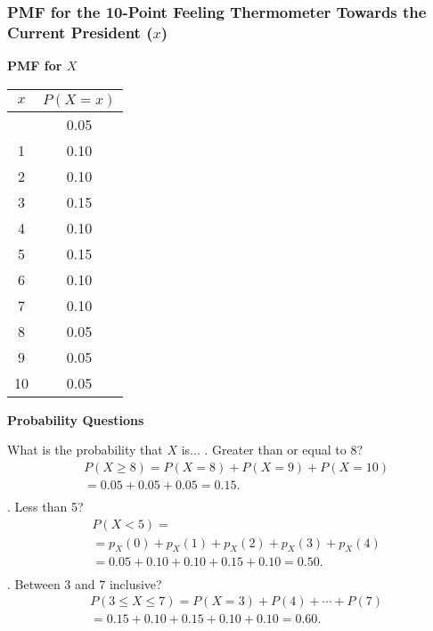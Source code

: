 \documentclass[handout]{beamer} %
\begin{document}
\begin{frame}
\frametitle{PMF for the 10-Point Feeling Thermometer Towards the Current President ($x$)}
    \begin{minipage}[t]{0.3\linewidth}
        \textbf{PMF for \( X \)} \\
        \begin{tabular}{c|c}
            \toprule
            \( x \) & \( P(X=x) \) \\
            \midrule \pause 
            0 & 0.05 \\
            1 & 0.10 \\
            2 & 0.10 \\
            3 & 0.15 \\
            4 & 0.10 \\
            5 & 0.15 \\
            6 & 0.10 \\
            7 & 0.10 \\
            8 & 0.05 \\
            9 & 0.05 \\
            10 & 0.05 \\
            \bottomrule 
        \end{tabular} \pause 
    \end{minipage}%
    \begin{minipage}[t]{0.55\linewidth}

        \textbf{Probability Questions}

\small
What is the probability that  $X$ is... . Greater than or equal to 8? \newline \vspace{-1.5em} \pause 
\begin{align*}
   & P(X \geq 8) = P(X=8) + P(X=9) + P(X=10) \\[0.1em]  
   & = 0.05 + 0.05 + 0.05 = 0.15. \\[-2em] 
\end{align*} . Less than 5?  \newline \vspace{-1.5em} \pause 
\begin{align*}  
   & P(X < 5) = \\[0.1em]
   & = p_X(0) + p_X(1) + p_X(2) + p_X(3) + p_X(4) \\[0.1em]
   & = 0.05 + 0.10 + 0.10 + 0.15 + 0.10 = 0.50. \\[-2em]  
\end{align*} . Between 3 and 7 inclusive?  \newline \vspace{-1.5em} \pause 
\begin{align*}  
   & P(3 \leq X \leq 7) = P(X=3) + P(4) + \cdots + P(7) \\
   & = 0.15 + 0.10 + 0.15 + 0.10 + 0.10 = 0.60.
\end{align*}

\end{minipage}
\end{frame}
\end{document}
